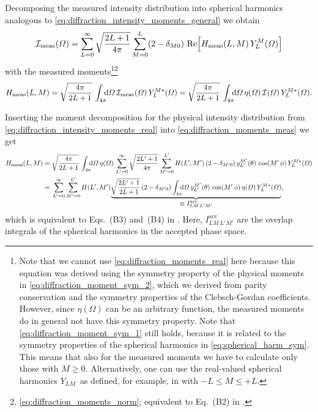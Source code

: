 Decomposing the measured intensity distribution into spherical
harmonics analogous to \cref{eq:diffraction_intensity_moments_general}
we obtain
\begin{equation}
  \label{eq:diffraction_intensity_moments_meas}
  \intensity_\text{meas}(\Omega)
  = \sum_{L = 0}^\infty \sqrt{\frac{2 L + 1}{4 \pi}} \sum_{M = 0}^{L} (2 - \delta_{M 0})\, \Re{H_\text{meas}(L, M)\, Y_L^M(\Omega)}
\end{equation}
with the measured
moments\footnote{\label{fn:complex_moment_decomp}Note that we cannot
use \cref{eq:diffraction_moments_real} here because this equation was
derived using the symmetry property of the physical moments in
\cref{eq:diffraction_moment_sym_2}, which we derived from parity
conservation and the symmetry properties of the Clebsch-Gordan
coefficients.  However, since $\eta(\Omega)$ can be an arbitrary
function, the measured moments do in general not have this symmetry
property.  Note that \cref{eq:diffraction_moment_sym_1} still holds,
because it is related to the symmetry properties of the spherical
harmonics in \cref{eq:spherical_harm_sym}.  This means that also for
the measured moments we have to calculate only those with $M \geq 0$.
Alternatively, one can use the real-valued spherical harmonics $Y_{L
M}$\footnotemark\ as defined, for example, in
 with $-L \leq M \leq
+L$.}\footnote{\Confer
\cref{eq:diffraction_moments_norm}; equivalent to Eq.~(B2) in
.}
\begin{equation}
  \label{eq:diffraction_moments_meas}
  H_\text{meas}(L, M)
  = \sqrt{\frac{4 \pi}{2 L + 1}}\, \int_{4 \pi}\!\!\! \dif{\Omega}\, \intensity_\text{meas}(\Omega)\, Y_L^{M *}(\Omega)
  = \sqrt{\frac{4 \pi}{2 L + 1}}\, \int_{4 \pi}\!\!\! \dif{\Omega}\, \eta(\Omega)\, \intensity(\Omega)\, Y_L^{M *}(\Omega).
\end{equation}

Inserting the moment decomposition for the physical intensity distribution
from \cref{eq:diffraction_intensity_moments_real} into
\cref{eq:diffraction_moments_meas} we get
\begin{align}
  H_\text{meas}(L, M)
  ={}& \sqrt{\frac{4 \pi}{2 L + 1}}\, \int_{4 \pi}\!\!\! \dif{\Omega}\, \eta(\Omega)\,
  \sum_{L' = 0}^\infty \sqrt{\frac{2 L' + 1}{4 \pi}} \sum_{M' = 0}^{L'} H(L', M')\, (2 - \delta_{M' 0})\, y_{L'}^{M'}(\theta)\, \cos(M'\, \phi)\,
  Y_L^{M *}(\Omega) \nonumber
  \\
  \label{eq:diffraction_moments_meas2}
  ={}& \sum_{L' = 0}^\infty \sum_{M' = 0}^{L'} H(L', M')
  \dUnderbrace{\sqrt{\frac{2 L' + 1}{2 L + 1}}\, (2 - \delta_{M' 0}) \int_{4 \pi}\!\!\! \dif{\Omega}\,
  y_{L'}^{M'}(\theta)\, \cos(M'\, \phi)\, \eta(\Omega)\, Y_L^{M *}(\Omega)}{\equiv I^\text{acc}_{L M\, L' M'}},
\end{align}
which is equivalent to Eqs.~(B3) and~(B4) in .
Here, $I^\text{acc}_{L M\, L' M'}$ are the overlap integrals of the
spherical harmonics in the accepted phase space.

